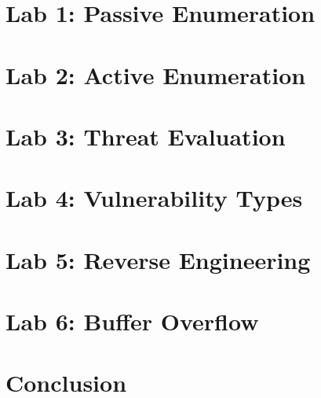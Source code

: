 \documentclass[oneside,openright,titlepage,numbers=noenddot,headinclude,footinclude=true,cleardoublepage=empty,listof=totoc,paper=a4,fontsize=11pt,english,BCOR=5mm]{scrreprt}
\begin{document}
  \frenchspacing
  \raggedbottom{}

  \pagestyle{plain}

  \singlespacing{}
  

  \onehalfspacing{}
  

  \cleardoublepage{}
  \pagestyle{scrheadings}
  \onehalfspacing{}
  \chapter{Lab 1: Passive Enumeration}\label{c:Lab-1}
  

  \chapter{Lab 2: Active Enumeration}\label{c:Lab-2}
  

  \chapter{Lab 3: Threat Evaluation}\label{c:Lab-3}
  

  \chapter{Lab 4: Vulnerability Types}\label{c:Lab-4}
  

  \chapter{Lab 5: Reverse Engineering}\label{c:Lab-5}
  

  \chapter{Lab 6: Buffer Overflow}\label{c:Lab-6}
  

  \chapter{Conclusion}\label{c:Conclusion}
  

  \cleardoublepage{}
  \appendix

  \singlespacing{}
  
  \cleardoublepage{}
\end{document}
